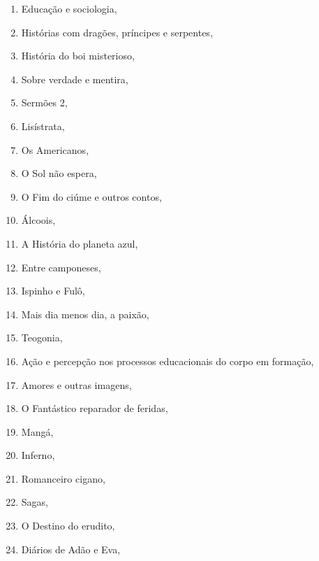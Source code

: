 \begin{multicols}{2}
\begin{enumerate}
\item Educação e sociologia, {}
\item Histórias com dragões, príncipes e serpentes, {}
\item História do boi misterioso, {}
\item Sobre verdade e mentira, {}
\item Sermões 2, {}
\item Lisístrata, {}
\item Os Americanos, {}
\item O Sol não espera, {}
\item O Fim do ciúme e outros contos, {}
\item Álcoois, {}
\item A História do planeta azul, {}
\item Entre camponeses, {}
\item Ispinho e Fulô, {}
\item Mais dia menos dia, a paixão, {}
\item Teogonia, {}
\item Ação e percepção nos processos educacionais do corpo em formação, {}
\item Amores e outras imagens, {}
\item O Fantástico reparador de feridas, {}
\item Mangá, {}
\item Inferno, {}
\item Romanceiro cigano, {}
\item Sagas, {}
\item O Destino do erudito, {}
\item Diários de Adão e Eva, {}

\end{enumerate}
\end{multicols}
